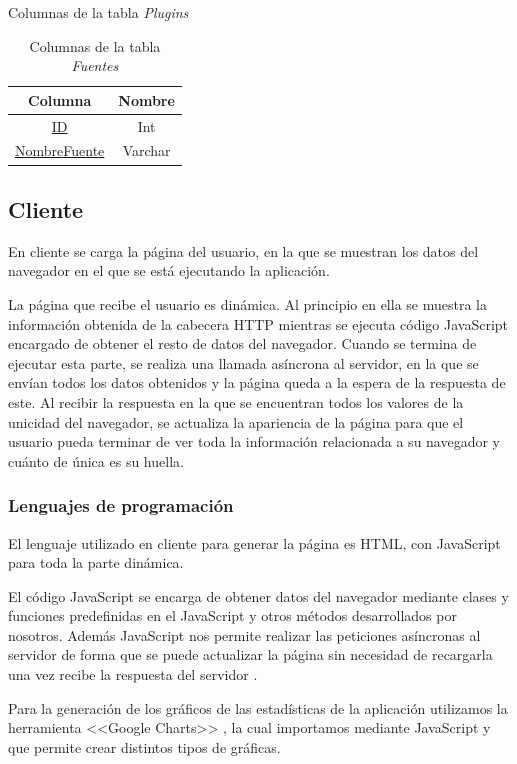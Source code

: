 \begin{itemize}
\begin{table}[h]
\begin{minipage}[c]{70mm}
            \caption{Columnas de la tabla \textit{Plugins}}
            \label{tab:plugins}
        \end{minipage}
        \begin{minipage}[c]{70mm}
        \centering
            \begin{tabular}{c|c}
                \textbf{Columna} & \textbf{Nombre} \\ \hline
                \underline{ID} & Int \\
                \underline{NombreFuente} & Varchar\\
            \end{tabular}
            \caption{Columnas de la tabla \textit{Fuentes}}
            \label{tab:fuentes}
        \end{minipage}
    \end{table}
\end{itemize}
\subsection{Cliente}
En cliente se carga la página del usuario, en la que se muestran los datos del navegador en el que se está ejecutando la aplicación.\par
La página que recibe el usuario es dinámica. Al principio en ella se muestra la información obtenida de la cabecera HTTP mientras se ejecuta código JavaScript encargado de obtener el resto de datos del navegador. Cuando se termina de ejecutar esta parte, se realiza una llamada asíncrona al servidor, en la que se envían todos los datos obtenidos y la página queda a la espera de la respuesta de este. Al recibir la respuesta en la que se encuentran todos los valores de la unicidad del navegador, se actualiza la apariencia de la página para que el usuario pueda terminar de ver toda la información relacionada a su navegador y cuánto de única es su huella. 
\subsubsection{Lenguajes de programación}
El lenguaje utilizado en cliente para generar la página es HTML, con JavaScript para toda la parte dinámica.\par
El código JavaScript se encarga de obtener datos del navegador mediante clases y funciones predefinidas en el JavaScript y otros métodos desarrollados por nosotros. Además JavaScript nos permite realizar las peticiones asíncronas al servidor de forma que se puede actualizar la página sin necesidad de recargarla una vez recibe la respuesta del servidor \cite{ajax}.\par 
Para la generación de los gráficos de las estadísticas de la aplicación utilizamos la herramienta <<Google Charts>> \cite{GoogleCharts}, la cual importamos mediante JavaScript y que permite crear distintos tipos de gráficas.
\newpage

